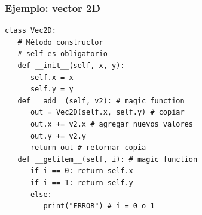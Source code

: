 \documentclass[14pt,aspectratio=169,xcolor=dvipsnames]{beamer}
\begin{document}
\begin{frame}[fragile]\frametitle{Ejemplo: vector 2D}
    \begin{footnotesize}
    \begin{verbatim}
class Vec2D:
   # Método constructor
   # self es obligatorio
   def __init__(self, x, y):
      self.x = x 
      self.y = y
   def __add__(self, v2): # magic function
      out = Vec2D(self.x, self.y) # copiar
      out.x += v2.x # agregar nuevos valores
      out.y += v2.y
      return out # retornar copia
   def __getitem__(self, i): # magic function
      if i == 0: return self.x
      if i == 1: return self.y
      else:
         print("ERROR") # i = 0 o 1
    \end{verbatim}
    \end{footnotesize}
\end{frame}
\end{document}
